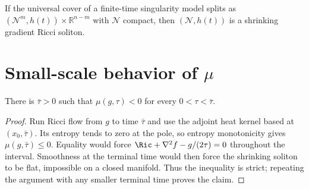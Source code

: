 \begin{remark}
\label{rem:chow-iii-ch17-compact-factor-shrinker}
If the universal cover of a finite-time singularity model splits as
$(\mathcal N^m,h(t))\times\mathbb R^{n-m}$ with $\mathcal N$ compact, then
$(\mathcal N,h(t))$ is a shrinking gradient Ricci soliton.
\end{remark}

\section{Small-scale behavior of \texorpdfstring{$\mu$}{mu}}

\begin{lemma}
\label{lem:chow-iii-ch17-mu-negative-small-scale}
There is $\bar\tau>0$ such that $\mu(g,\tau)<0$ for every
$0<\tau<\bar\tau$.
\end{lemma}
\begin{proof}
\sketch Run Ricci flow from $g$ to time $\bar\tau$ and use the adjoint heat kernel
based at $(x_0,\bar\tau)$.  Its entropy tends to zero at the pole, so entropy
monotonicity gives $\mu(g,\bar\tau)\le0$.  Equality would force
$\Ric+\nabla^2f-g/(2\tau)=0$ throughout the interval.  Smoothness at the
terminal time would then force the shrinking soliton to be flat, impossible
on a closed manifold.  Thus the inequality is strict; repeating the argument
with any smaller terminal time proves the claim.
\end{proof}

